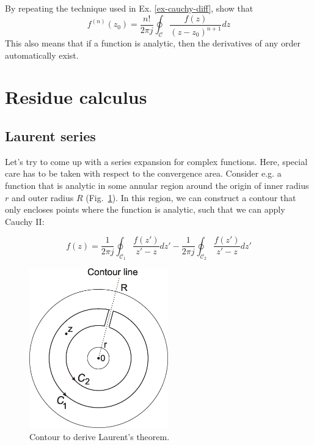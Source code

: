 \begin{sidebar}
\begin{ex}
By repeating the technique used in Ex. \ref{ex-cauchy-diff}, show that
$$f^{(n)}(z_0)=\frac{n!}{2 \pi j} \oint_{\mathcal{C}} \frac{f(z)} {(z-z_0)^{n+1}} dz$$
This also means that if a function is analytic, then the derivatives of any order automatically exist.
\end{ex}
\end{sidebar}

\section{Residue calculus}

\subsection{Laurent series}

Let's try to come up with a series expansion for complex functions. Here, special care has to be taken with respect to the convergence area. Consider e.g. a function that is analytic in some annular region around the origin of inner radius $r$ and outer radius $R$ (Fig.~\ref{fig-laurent}). In this region, we can construct a contour that only encloses points where the function is analytic, such that we can apply
Cauchy II:

\begin{equation}
f(z)=\frac{1}{2 \pi j }\oint_{\mathcal{C}_1} \frac{f(z')} {z'-z} dz' -\frac{1}{2
\pi j }\oint_{\mathcal{C}_2} \frac{f(z')} {z'-z} dz' \label{laurent_0}
\end{equation} 

\begin{figure}
\centering
\includegraphics[width=6cm]{complex/figures/laurent}
\caption{Contour to derive Laurent's theorem.}
\label{fig-laurent}
\end{figure}


